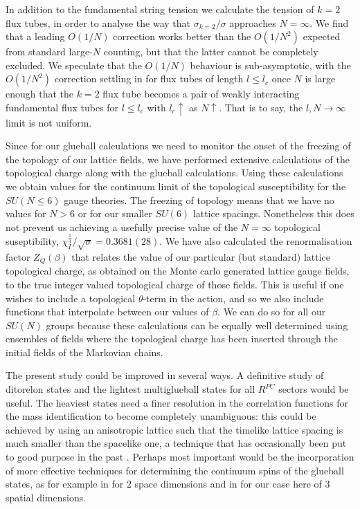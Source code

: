 \documentclass[12pt]{article}
\begin{document}
In addition to the fundamental string tension we calculate the tension of $k=2$ flux tubes,
in order to analyse the way that $\sigma_{k=2}/\sigma$ approaches $N=\infty$. We find that
a leading $O(1/N)$ correction works better than the $O(1/N^2)$ expected from standard
large-$N$ counting, but that the latter cannot be completely excluded. We speculate
that the  $O(1/N)$ behaviour is sub-asymptotic, with the $O(1/N^2)$ correction 
settling in for flux tubes of length $l\leq l_c$ once $N$ is large enough that the $k=2$ 
flux tube becomes a pair of weakly interacting fundamental flux tubes for $l\leq l_c$
with  $l_c\uparrow$ as  $N\uparrow$. That is to say, the $l,N\to\infty$ limit is
not uniform.

Since for our glueball calculations  we need to monitor the onset of the freezing
of the topology of our lattice fields, we have performed extensive calculations of the
topological charge along with the glueball calculations. Using these calculations 
we obtain values for the continuum limit of the topological susceptibility for the
$SU(N\leq 6)$ gauge theories. The freezing of topology means that we have no values
for $N > 6$ or for our smaller $SU(6)$ lattice spacings. Nonetheless this does not
prevent us achieving a usefully precise value of the $N=\infty$ topological suseptibility,
$\chi_I^{\frac{1}{4}}/\surd\sigma = 0.3681(28)$. We have also calculated the renormalisation
factor $Z_Q(\beta)$ that relates the value of our particular (but standard) lattice topological
charge, as obtained on the Monte carlo generated lattice gauge fields, to the true integer
valued topological charge of those fields. This is useful if one wishes to include
a topological $\theta$-term in the action, and so we also include functions that
interpolate between our values of $\beta$. We can do so for all our $SU(N)$ groups
because these calculations can be equally well determined using ensembles of fields
where the topological charge has been inserted through the initial fields of the
Markovian chains.

The present study could be improved in several ways. A definitive study of ditorelon states
and the lightest multiglueball states for all $R^{PC}$ sectors would be useful.
The heaviest states need a finer resolution in the correlation functions for the
mass identification to become completely unambiguous: this could be achieved by using
an anisotropic lattice such that the timelike lattice spacing is much smaller than the
spacelike one, a technique that has occasionally been put to good purpose in the past
%
\cite{KIGSMT-SU2-1983,KIGSMT-SU3-1983,MP-1999,MP-2005}.
%
Perhaps most important would be the incorporation of more effective techniques for
determining the continuum spins of the glueball states, as for example in
%
\cite{PCSDMT-2019}
%
for 2 space dimensions and in
%
\cite{HM_Thesis}
%
for our case here of 3 spatial dimensions.
\end{document}
